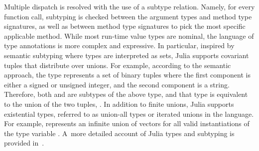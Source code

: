 
Multiple dispatch is resolved with the use of a subtype relation.
Namely, for every function call, subtyping is checked between
the argument types and method type signatures,
as well as between method type signatures
to pick the most specific applicable method.
While most run-time value types are nominal, %
the language of type annotations is more complex and expressive. 
In particular, inspired by semantic subtyping
where types are interpreted as sets,
Julia supports covariant tuples that distribute over unions.
For example, according to the semantic approach, the type 
 represents a set of binary
tuples where the first component is either a signed or unsigned integer,
and the second component is a string. Therefore, both
 and  are subtypes
of the above type, and that type is equivalent to the union of the two
tuples, .
In addition to finite unions, Julia supports existential types, referred to as
union-all types or iterated unions in the language. 
For example, 
represents an infinite union of vectors  for all valid
instantiations  of the type variable .
A~more detailed account of Julia types and subtyping
is provided in~.

